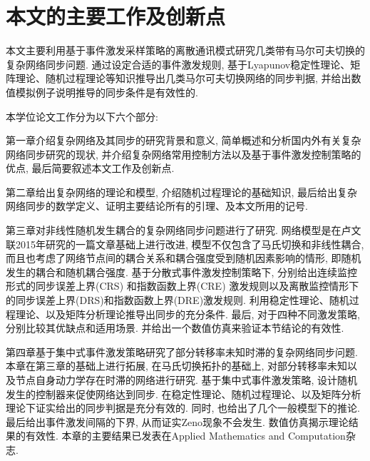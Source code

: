 %


\section{本文的主要工作及创新点}

本文主要利用基于事件激发采样策略的离散通讯模式研究几类带有马尔可夫切换的复杂网络同步问题. 通过设定合适的事件激发规则, 基于Lyapunov稳定性理论、矩阵理论、随机过程理论等知识推导出几类马尔可夫切换网络的同步判据, 并给出数值模拟例子说明推导的同步条件是有效性的.

本学位论文工作分为以下六个部分:

第一章介绍复杂网络及其同步的研究背景和意义, 简单概述和分析国内外有关复杂网络同步研究的现状, 并介绍复杂网络常用控制方法以及基于事件激发控制策略的优点, 最后简要叙述本文工作及创新点.

第二章给出复杂网络的理论和模型, 介绍随机过程理论的基础知识, 最后给出复杂网络同步的数学定义、证明主要结论所有的引理、及本文所用的记号.

第三章对非线性随机发生耦合的复杂网络同步问题进行了研究. 网络模型是在卢文联2015年研究的一篇文章基础上进行改进, 模型不仅包含了马氏切换和非线性耦合, 而且也考虑了网络节点间的耦合关系和耦合强度受到随机因素影响的情形, 即随机发生的耦合和随机耦合强度. 基于分散式事件激发控制策略下, 分别给出连续监控形式的同步误差上界(CRS) 和指数函数上界(CRE) 激发规则以及离散监控情形下的同步误差上界(DRS)和指数函数上界(DRE)激发规则. 利用稳定性理论、随机过程理论、以及矩阵分析理论推导出同步的充分条件. 最后, 对于四种不同激发策略, 分别比较其优缺点和适用场景. 并给出一个数值仿真来验证本节结论的有效性.

第四章基于集中式事件激发策略研究了部分转移率未知时滞的复杂网络同步问题. 本章在第三章的基础上进行拓展, 在马氏切换拓扑的基础上, 对部分转移率未知以及节点自身动力学存在时滞的网络进行研究. 基于集中式事件激发策略, 设计随机发生的控制器来促使网络达到同步. 在稳定性理论、随机过程理论、以及矩阵分析理论下证实给出的同步判据是充分有效的. 同时, 也给出了几个一般模型下的推论. 最后给出事件激发间隔的下界, 从而证实Zeno现象不会发生. 数值仿真揭示理论结果的有效性. 本章的主要结果已发表在Applied Mathematics and Computation杂志.

